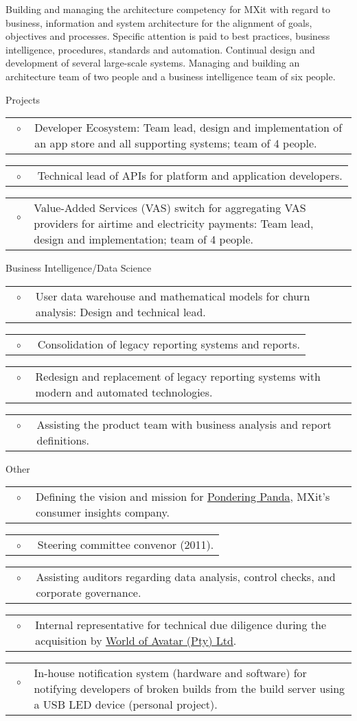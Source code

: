 \documentclass[10pt,a4paper,final]{columncv}
\makeatletter
\newcommand{\cvitembullet}[1]{%
  \begin{tabularx}{\linewidth}{@{}l@{\hspace{0.1em}}X@{}}
    ~$\circ$~ & #1 \\
  \end{tabularx}%
}
\makeatother
\begin{document}
\begin{cvenv}

         {Building and managing the architecture competency for MXit with regard to
          business, information and system architecture for the alignment of goals,
          objectives and processes. Specific attention is paid to best practices, business
          intelligence, procedures, standards and automation. Continual design and
          development of several large-scale systems. Managing and building an architecture
          team of two people and a business intelligence team of six people.}
         {Projects
            \cvitembullet{Developer Ecosystem: Team lead, design and implementation
             of an app store and all supporting systems; team of 4 people.}
            \cvitembullet{Technical lead of APIs for platform and application developers.}
            \cvitembullet{Value-Added Services (VAS) switch for aggregating VAS providers
              for airtime and electricity payments: Team lead, design and
              implementation; team of 4 people.}
          Business Intelligence/Data Science
            \cvitembullet{User data warehouse and mathematical models for churn analysis:
              Design and technical lead.}
            \cvitembullet{Consolidation of legacy reporting systems and reports.}
            \cvitembullet{Redesign and replacement of legacy reporting systems with modern and
              automated technologies.}
            \cvitembullet{Assisting the product team with business analysis and report
              definitions.}
          Other
            \cvitembullet{Defining the vision and mission for \href{http://www.ponderingpanda.com/}{Pondering Panda}, MXit's
              consumer insights company.}
            \cvitembullet{Steering committee convenor (2011).}
            \cvitembullet{Assisting auditors regarding data analysis, control checks, and
              corporate governance.}
            \cvitembullet{Internal representative for technical due diligence during the
              acquisition by \href{http://www.worldofavatar.com/}{World of Avatar (Pty) Ltd}.}
            \cvitembullet{In-house notification system (hardware and software) for notifying
              developers of broken builds from the build server using a USB
              LED device (personal project).}
         }
\end{cvenv}
\end{document}

